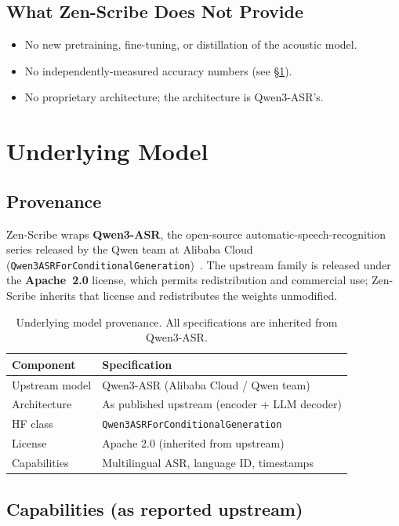 \documentclass[11pt,a4paper]{article}
\begin{document}
\subsection{What Zen-Scribe Does Not Provide}
\begin{itemize}
    \item No new pretraining, fine-tuning, or distillation of the acoustic model.
    \item No independently-measured accuracy numbers (see \S\ref{sec:upstream}).
    \item No proprietary architecture; the architecture is Qwen3-ASR's.
\end{itemize}

\section{Underlying Model}
\label{sec:upstream}

\subsection{Provenance}

Zen-Scribe wraps \textbf{Qwen3-ASR}, the open-source automatic-speech-recognition
series released by the Qwen team at Alibaba Cloud
(\texttt{Qwen3ASRForConditionalGeneration})~\cite{qwen3asr}. The upstream family is
released under the \textbf{Apache~2.0} license, which permits redistribution and
commercial use; Zen-Scribe inherits that license and redistributes the weights
unmodified.

\begin{table}[H]
\centering
\begin{tabular}{ll}
\toprule
\textbf{Component} & \textbf{Specification} \\
\midrule
Upstream model & Qwen3-ASR (Alibaba Cloud / Qwen team) \\
Architecture & As published upstream (encoder + LLM decoder) \\
HF class & \texttt{Qwen3ASRForConditionalGeneration} \\
License & Apache 2.0 (inherited from upstream) \\
Capabilities & Multilingual ASR, language ID, timestamps \\
\bottomrule
\end{tabular}
\caption{Underlying model provenance. All specifications are inherited from Qwen3-ASR.}
\end{table}

\subsection{Capabilities (as reported upstream)}
\end{document}
